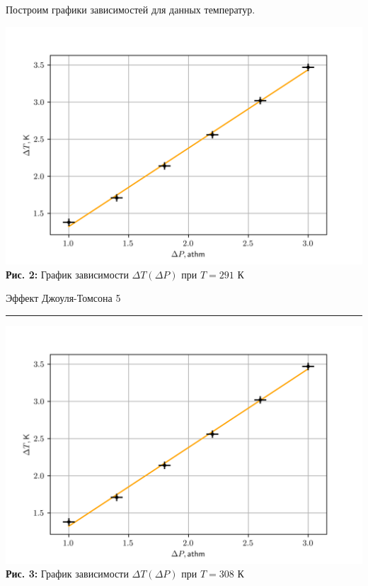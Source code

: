 \documentclass[12pt,a4paper]{scrartcl}
\begin{document}
	Построим графики зависимостей для данных температур.
	
	\begin{center}
		\includegraphics[scale=0.8]{PIC_2.png}
		\\\textbf{Рис. 2:} График зависимости $\Delta T (\Delta P)$ при $T = 291$ К
	\end{center}

	\newpage 
	
	
	\begin{flushleft}
		\footnotesize{Эффект Джоуля-Томсона} \hspace{\fill} \footnotesize{5}
		\\[-0.3cm]\noindent\rule{\textwidth}{0.3pt}
	\end{flushleft}

	\begin{center}
		\includegraphics[scale=0.8]{PIC_2.png}
		\\\textbf{Рис. 3:} График зависимости $\Delta T (\Delta P)$ при $T = 308$ К
	\end{center}
\end{document}
